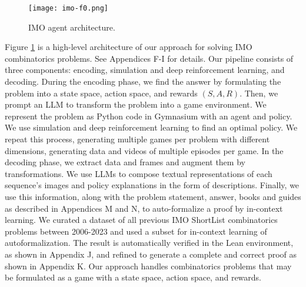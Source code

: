 \begin{figure}[ht]
    \centering
    \texttt{[image: imo-f0.png]}
    \caption{IMO agent architecture.}
    \label{imo-arch-f0}
\end{figure}

Figure \ref{imo-arch-f0} is a high-level architecture of our approach for solving IMO combinatorics problems. See Appendices F-I for details. Our pipeline consists of three components: encoding, simulation and deep reinforcement learning, and decoding. During the encoding phase, we find the answer by formulating the problem into a state space, action space, and rewards $(S, A, R)$. Then, we prompt an LLM to transform the problem into a game environment. We represent the problem as Python code in Gymnasium with an agent and policy. We use simulation and deep reinforcement learning to find an optimal policy. We repeat this process, generating multiple games per problem with different dimensions, generating data and videos of multiple episodes per game. In the decoding phase, we extract data and frames and augment them by transformations. We use LLMs to compose textual representations of each sequence's images and policy explanations in the form of descriptions. Finally, we use this information, along with the problem statement, answer, books and guides as described in Appendices M and N, to auto-formalize a proof by in-context learning. We curated a dataset of all previous IMO ShortList combinatorics problems between 2006-2023 and used a subset for in-context learning of autoformalization. The result is automatically verified in the Lean environment, as shown in Appendix J, and refined to generate a complete and correct proof as shown in Appendix K. Our approach handles combinatorics problems that may be formulated as a game with a state space, action space, and rewards.

